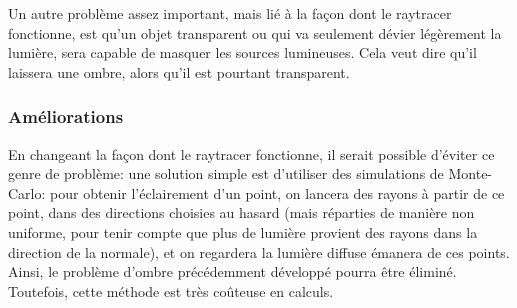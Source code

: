 \documentclass[a4paper]{article}
\begin{document}
    Un autre problème assez important, mais lié à la façon dont le raytracer fonctionne, est qu'un objet transparent ou qui va seulement
    dévier légèrement la lumière, sera capable de masquer les sources lumineuses.
    Cela veut dire qu'il laissera une ombre, alors qu'il est pourtant transparent.

    \subsubsection{Améliorations}

    En changeant la façon dont le raytracer fonctionne, il serait possible d'éviter ce genre de problème: une solution simple est d'utiliser
    des simulations de Monte-Carlo:
    pour obtenir l'éclairement d'un point, on lancera des rayons à partir de ce point, dans des directions choisies au hasard (mais réparties de manière non
    uniforme, pour tenir compte que plus de lumière provient des rayons dans la direction de la normale), et on regardera la lumière diffuse émanera de ces points.
    Ainsi, le problème d'ombre précédemment développé pourra être éliminé.
    Toutefois, cette méthode est très coûteuse en calculs.
\end{document}
